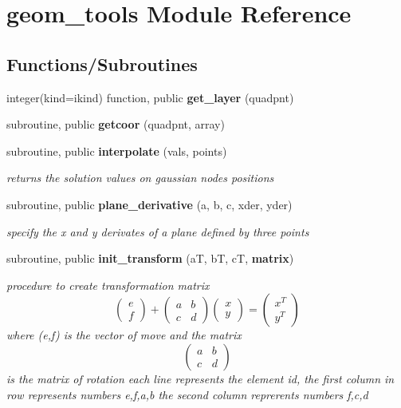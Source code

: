 \section{geom\+\_\+tools Module Reference}
\label{namespacegeom__tools}
\subsection*{Functions/\+Subroutines}
\begin{DoxyCompactItemize}
\item 
integer(kind=ikind) function, public {\bf get\+\_\+layer} (quadpnt)
\item 
subroutine, public {\bf getcoor} (quadpnt, array)
\item 
subroutine, public {\bf interpolate} (vals, points)
\begin{DoxyCompactList}\small\item\em returns the solution values on gaussian nodes positions \end{DoxyCompactList}\item 
subroutine, public {\bf plane\+\_\+derivative} (a, b, c, xder, yder)
\begin{DoxyCompactList}\small\item\em specify the x and y derivates of a plane defined by three points \end{DoxyCompactList}\item 
subroutine, public {\bf init\+\_\+transform} (aT, bT, cT, {\bf matrix})
\begin{DoxyCompactList}\small\item\em procedure to create transformation matrix \[ \left( \begin{array}{c} e \\ f \end{array} \right) + \left( \begin{array}{cc} a & b \\ c & d \end{array}\right) \left( \begin{array}{c} x \\ y \end{array} \right) = \left( \begin{array}{c} x^T \\ y^T \end{array} \right) \] where (e,f) is the vector of move and the matrix \[ \left( \begin{array}{cc} a & b \\ c & d \end{array}\right) \] is the matrix of rotation each line represents the element id, the first column in row represents numbers e,f,a,b the second column reprerents numbers f,c,d \end{DoxyCompactList}\item 

\end{DoxyCompactItemize}
